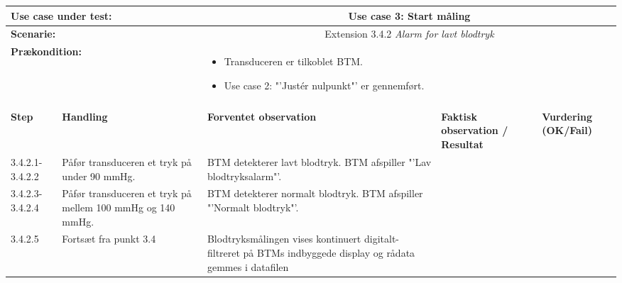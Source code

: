 \begin{tabular}{|p{1cm}|p{3cm}|p{4cm}|p{4cm}|p{2cm}|}
\hline
\multicolumn{2}{|p{3cm}|}{\textbf{Use case under test:}} & \multicolumn{3}{c|}{Use case 3: Start måling} \\\hline

\multicolumn{2}{|p{3cm}|}{\textbf{Scenarie:}} & \multicolumn{3}{c|}{Extension 3.4.2 \textit{Alarm for lavt blodtryk}} \\\hline

\multicolumn{2}{|p{3cm}|}{\textbf{Prækondition:}}  & \multicolumn{3}{l|}{\parbox{0.6\textwidth}{
\begin{itemize}[label=$\circ$]
\item Transduceren er tilkoblet BTM.
\item Use case 2: "'Justér nulpunkt"' er gennemført.  
\end{itemize} }}\\\hline

\multicolumn{5}{|c|}{} \\\hline

\textbf{Step} & \textbf{Handling} & \textbf{Forventet observation} & \textbf{Faktisk observation / Resultat} & \textbf{Vurdering (OK/Fail)}\\\hline

3.4.2.1-3.4.2.2 & Påfør transduceren et tryk på under 90 mmHg. & BTM detekterer lavt blodtryk. BTM afspiller "'Lav blodtryksalarm"'.  & & 
\\\hline
3.4.2.3-3.4.2.4 & Påfør transduceren et tryk på mellem 100 mmHg og 140 mmHg. & BTM detekterer normalt blodtryk. BTM afspiller "'Normalt blodtryk"'.  & & 
\\\hline
3.4.2.5 & Fortsæt fra punkt 3.4 & Blodtryksmålingen vises kontinuert digitalt-filtreret på BTMs indbyggede display og rådata gemmes i datafilen & & 
\\\hline

\end{tabular}

\newpage

